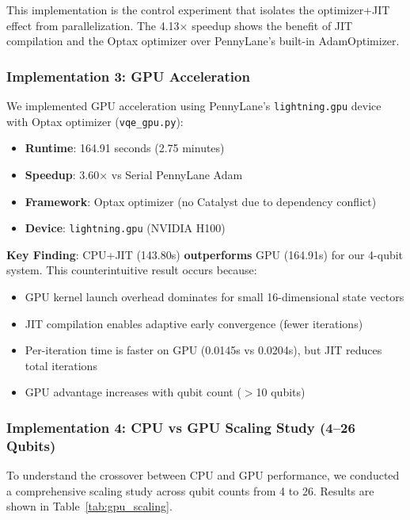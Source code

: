 \documentclass[11pt]{article}
\begin{document}
This implementation is the control experiment that isolates the optimizer+JIT effect from parallelization. The 4.13× speedup shows the benefit of JIT compilation and the Optax optimizer over PennyLane's built-in AdamOptimizer.

\subsubsection{Implementation 3: GPU Acceleration}

We implemented GPU acceleration using PennyLane's \texttt{lightning.gpu} device with Optax optimizer (\texttt{vqe\_gpu.py}):

\begin{itemize}
    \item \textbf{Runtime}: 164.91 seconds (2.75 minutes)
    \item \textbf{Speedup}: 3.60× vs Serial PennyLane Adam
    \item \textbf{Framework}: Optax optimizer (no Catalyst due to dependency conflict)
    \item \textbf{Device}: \texttt{lightning.gpu} (NVIDIA H100)
\end{itemize}

\textbf{Key Finding}: CPU+JIT (143.80s) \textbf{outperforms} GPU (164.91s) for our 4-qubit system. This counterintuitive result occurs because:
\begin{itemize}
    \item GPU kernel launch overhead dominates for small 16-dimensional state vectors
    \item JIT compilation enables adaptive early convergence (fewer iterations)
    \item Per-iteration time is faster on GPU (0.0145s vs 0.0204s), but JIT reduces total iterations
    \item GPU advantage increases with qubit count ($>$10 qubits)
\end{itemize}

\subsubsection{Implementation 4: CPU vs GPU Scaling Study (4--26 Qubits)}

To understand the crossover between CPU and GPU performance, we conducted a comprehensive scaling study across qubit counts from 4 to 26. Results are shown in Table~\ref{tab:gpu_scaling}.
\end{document}

